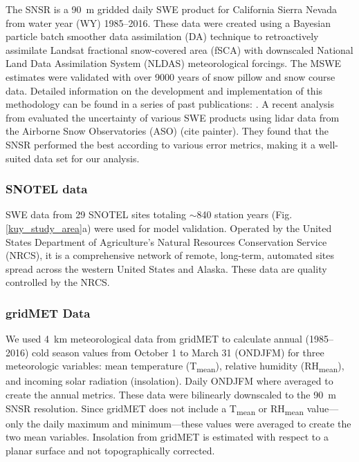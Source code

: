 The SNSR \citep{margulisLandsatEraSierraNevada2016} is a 90~m gridded daily SWE product for California Sierra Nevada from water year (WY) 1985--2016. These data were created using a Bayesian particle batch smoother data assimilation (DA) technique to retroactively assimilate Landsat fractional snow-covered area (fSCA) with downscaled National Land Data Assimilation System (NLDAS) meteorological forcings. The MSWE estimates were validated with over 9000 years of snow pillow and snow course data. Detailed information on the development and implementation of this methodology can be found in a series of past publications: \cite{durandBayesianApproachSnow2008, girottoExaminingSpatialTemporal2014, girottoProbabilisticSWEReanalysis2014, margulisParticleBatchSmoother2015}. A recent analysis from \citep{yangIntercomparisonSnowWater2023} evaluated the uncertainty of various SWE products using lidar data from the Airborne Snow Observatories (ASO) (cite painter). They found that the SNSR performed the best according to various error metrics, making it a well-suited data set for our analysis.

\hypertarget{ch2-do-2}{\subsubsection{SNOTEL data}\label{ch2-do-2}}

SWE data from 29 SNOTEL sites totaling $\sim$840 station years (Fig. \ref{kuy_study_area}a) were used for model validation. Operated by the United States Department of Agriculture's Natural Resources Conservation Service (NRCS), it is a comprehensive network of remote, long-term, automated sites spread across the western United States and Alaska. These data are quality controlled by the NRCS.

\hypertarget{ch2-do-2}{\subsubsection{gridMET Data}\label{ch2-do-2}}

We used 4~km meteorological data from gridMET \citep{abatzoglouDevelopmentGriddedSurface2013} to calculate annual (1985--2016) cold season values from October 1 to March 31 (ONDJFM) for three meteorologic variables: mean temperature (T\textsubscript{mean}), relative humidity (RH\textsubscript{mean}), and incoming solar radiation (insolation). Daily ONDJFM where averaged to create the annual metrics. These data were bilinearly downscaled to the 90~m SNSR resolution. Since gridMET does not include a T\textsubscript{mean} or RH\textsubscript{mean} value---only the daily maximum and minimum---these values were averaged to create the two mean variables. Insolation from gridMET is estimated with respect to a planar surface and not topographically corrected. 

